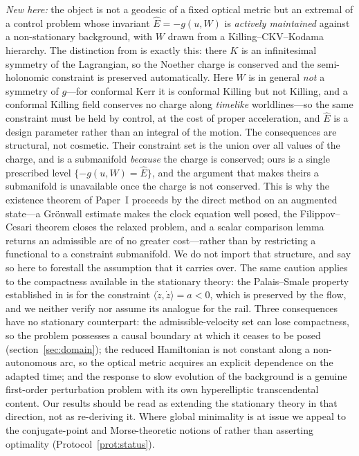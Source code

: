 \documentclass[12pt]{iopart}
\theoremstyle{plain}
\theoremstyle{definition}
\theoremstyle{remark}
\newcommand{\Ehat}{\hat E}
\begin{document}
\emph{New here:} the object is not a geodesic of a fixed optical metric but an extremal of
a control problem whose invariant $\Ehat=-g(u,W)$ is \emph{actively maintained} against a
non-stationary background, with $W$ drawn from a Killing--CKV--Kodama hierarchy. The
distinction from \cite{CaponioCoronaGiamboPiccione2024} is exactly this: there $K$ is an
infinitesimal symmetry of the Lagrangian, so the Noether charge is conserved and the
semi-holonomic constraint is preserved automatically. Here $W$ is in general \emph{not} a
symmetry of $g$---for conformal Kerr it is conformal Killing but not Killing, and a
conformal Killing field conserves no charge along \emph{timelike} worldlines---so the
same constraint must be held by control, at the cost of proper acceleration, and $\Ehat$
is a design parameter rather than an integral of the motion. The consequences are
structural, not cosmetic. Their constraint set is the union over all values of the
charge, and is a submanifold \emph{because} the charge is conserved; ours is a single
prescribed level $\{-g(u,W)=\Ehat\}$, and the argument that makes theirs a submanifold is
unavailable once the charge is not conserved. This is why the existence theorem of
Paper~I proceeds by the direct method on an augmented state---a Gr\"onwall estimate makes
the clock equation well posed, the Filippov--Cesari theorem closes the relaxed problem, and
a scalar comparison lemma returns an admissible arc of no greater cost---rather than by
restricting a functional to a constraint submanifold. We do not import that structure,
and say so here to forestall the assumption that it carries over. The same caution
applies to the compactness available in the stationary theory: the Palais--Smale property
established in \cite{GiannoniMasielloPiccione1998} is for the constraint
$\langle\dot z,\dot z\rangle=a<0$, which is preserved by the flow, and we neither verify
nor assume its analogue for the rail.
Three
consequences have no stationary counterpart: the admissible-velocity set can lose
compactness, so the problem possesses a causal boundary at which it ceases to be posed
(section~\ref{sec:domain}); the reduced Hamiltonian is not constant along a non-autonomous arc, so
the optical metric acquires an explicit dependence on the adapted time; and the response to
slow evolution of the background is a genuine first-order perturbation problem with its own
hyperelliptic transcendental content. Our results should be read as extending the
stationary theory in that direction, not as re-deriving it. Where global minimality is at
issue we appeal to the conjugate-point and Morse-theoretic notions of
\cite{GiannoniPiccioneTausk2002,GiannoniPiccione2002} rather than asserting
optimality (Protocol~\ref{prot:status}).
\end{document}
